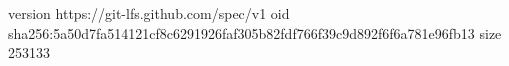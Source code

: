 version https://git-lfs.github.com/spec/v1
oid sha256:5a50d7fa514121cf8c6291926faf305b82fdf766f39c9d892f6f6a781e96fb13
size 253133
